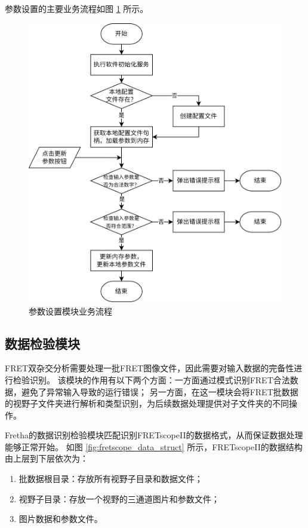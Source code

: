 参数设置的主要业务流程如图 \ref{fig:fretha_param_module_flow} 所示。

\begin{figure}[hbtp]
    \centering
    \includegraphics[height=1\linewidth]{../figures/2/2_成像参数设置模块业务流程.png}
    \caption{参数设置模块业务流程}
    \label{fig:fretha_param_module_flow}
\end{figure}
\fi

\subsection{数据检验模块}
\label{sec:数据检验模块}

FRET双杂交分析需要处理一批FRET图像文件，因此需要对输入数据的完备性进行检验识别。
该模块的作用有以下两个方面：一方面通过模式识别FRET合法数据，避免了异常输入导致的运行错误；
另一方面，在这一模块会将FRET批数据的视野子文件夹进行解析和类型识别，为后续数据处理提供对子文件夹的不同操作。

Fretha的数据识别检验模块匹配识别FRETscopeII的数据格式，从而保证数据处理能够正常开始。
如图 \ref{fig:fretscope_data_struct} 所示，FRETscopeII的数据结构由上层到下层依次为：
\begin{enumerate}
  \item 批数据根目录：存放所有视野子目录和数据文件；
  \item 视野子目录：存放一个视野的三通道图片和参数文件；
  \item 图片数据和参数文件。
\end{enumerate}

